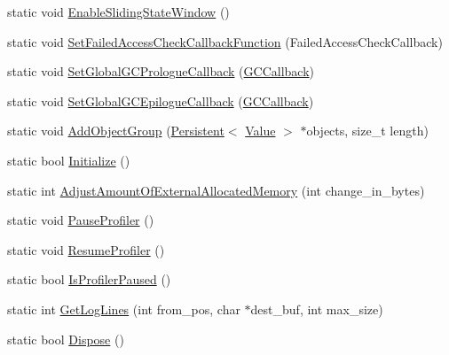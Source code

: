 \begin{DoxyCompactItemize}
\item 
static void \hyperlink{classv8_1_1_v8_aa91df5fe1bb98b87952ef4bbf0aceb96}{Enable\+Sliding\+State\+Window} ()
\item 
static void \hyperlink{classv8_1_1_v8_aa6ed646d43360c209881871b3ac747aa}{Set\+Failed\+Access\+Check\+Callback\+Function} (Failed\+Access\+Check\+Callback)
\item 
static void \hyperlink{classv8_1_1_v8_a503e14a77e922775bd88bc2e19e19886}{Set\+Global\+G\+C\+Prologue\+Callback} (\hyperlink{namespacev8_a226458957ce3c253b9a9f539bb5ddad4}{G\+C\+Callback})
\item 
static void \hyperlink{classv8_1_1_v8_a94bac5e06a99141c5629842e18558cfe}{Set\+Global\+G\+C\+Epilogue\+Callback} (\hyperlink{namespacev8_a226458957ce3c253b9a9f539bb5ddad4}{G\+C\+Callback})
\item 
static void \hyperlink{classv8_1_1_v8_a4744037e970e3b3bafcc3cac03a5967f}{Add\+Object\+Group} (\hyperlink{classv8_1_1_persistent}{Persistent}$<$ \hyperlink{classv8_1_1_value}{Value} $>$ $\ast$objects, size\+\_\+t length)
\item 
static bool \hyperlink{classv8_1_1_v8_a40daec93ce44bdd922567fc121be9db8}{Initialize} ()
\item 
static int \hyperlink{classv8_1_1_v8_a8e6f2e66c028d1ffa3f5e8a799790bc5}{Adjust\+Amount\+Of\+External\+Allocated\+Memory} (int change\+\_\+in\+\_\+bytes)
\item 
static void \hyperlink{classv8_1_1_v8_a5fefebea0cd37105837a9d267baf2e5c}{Pause\+Profiler} ()
\item 
static void \hyperlink{classv8_1_1_v8_ab0557aaba62c7fb253fe838003aa60af}{Resume\+Profiler} ()
\item 
static bool \hyperlink{classv8_1_1_v8_aa8dc5a7c3a059bb376882ac36b9df775}{Is\+Profiler\+Paused} ()
\item 
static int \hyperlink{classv8_1_1_v8_ac7e91e25ed7773db1f31413fb726bca7}{Get\+Log\+Lines} (int from\+\_\+pos, char $\ast$dest\+\_\+buf, int max\+\_\+size)
\item 
static bool \hyperlink{classv8_1_1_v8_a566450d632c0a63770682b9da3cae08d}{Dispose} ()
\end{DoxyCompactItemize}
